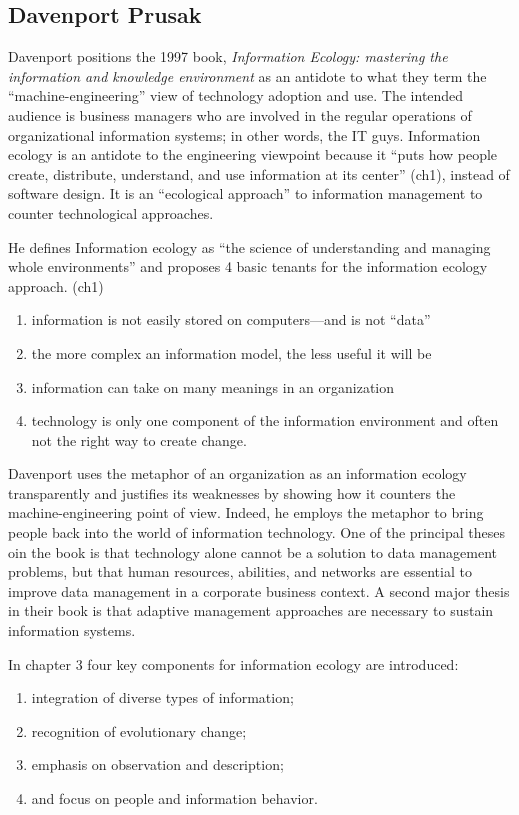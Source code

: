 \subsection{Davenport Prusak}

Davenport positions the 1997 book, \textit{Information Ecology: mastering the information and knowledge environment} as an antidote to what they term the ``machine-engineering'' view of technology adoption and use. The intended audience is business managers who are involved in the regular operations of organizational information systems; in other words, the IT guys. Information ecology is an antidote to the engineering viewpoint because it ``puts how people create, distribute, understand, and use information at its center'' (ch1), instead of software design. It is an ``ecological approach'' to information management to counter technological approaches.

He defines Information ecology as ``the science of understanding and managing whole environments'' and proposes 4 basic tenants for the information ecology approach. (ch1)
\begin{enumerate}
\item information is not easily stored on computers—and is not ``data''
\item the more complex an information model, the less useful it will be
\item information can take on many meanings in an organization
\item technology is only one component of the information environment and often not the right way to create change.
\end{enumerate}

Davenport uses the metaphor of an organization as an information ecology transparently and justifies its weaknesses by showing how it counters the machine-engineering point of view. Indeed, he employs the metaphor to bring people back into the world of information technology. One of the principal theses oin the book is that technology alone cannot be a solution to data management problems, but that human resources, abilities, and networks are essential to improve data management in a corporate business context. A second major thesis in their book is that adaptive management approaches are necessary to sustain information systems.

In chapter 3 four key components for information ecology are introduced: 

\begin{enumerate}
\item integration of diverse types of information;
\item recognition of evolutionary change;
\item emphasis on observation and description;
\item and focus on people and information behavior.
\end{enumerate}

